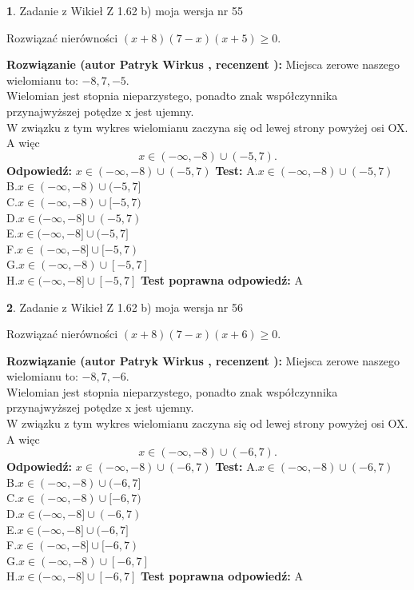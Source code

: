 \documentclass[12pt, a4paper]{article}
\theoremstyle{definition} %
\newtheorem{zad}{}
\newcommand{\zadStart}[1]{\begin{zad}#1\newline}
\newcommand{\zadStop}{\end{zad}}
\newcommand{\rozwStart}[2]{\noindent \textbf{Rozwiązanie (autor #1 , recenzent #2): }\newline}
\newcommand{\rozwStop}{\newline}
\newcommand{\odpStart}{\noindent \textbf{Odpowiedź:}\newline}
\newcommand{\odpStop}{\newline}
\newcommand{\testStart}{\noindent \textbf{Test:}\newline}
\newcommand{\testStop}{\newline}
\newcommand{\kluczStart}{\noindent \textbf{Test poprawna odpowiedź:}\newline}
\newcommand{\kluczStop}{\newline}
\begin{document}
\zadStart{Zadanie z Wikieł Z 1.62 b) moja wersja nr 55}

Rozwiązać nierówności $(x+8)(7-x)(x+5)\ge0$.
\zadStop
\rozwStart{Patryk Wirkus}{}
Miejsca zerowe naszego wielomianu to: $-8, 7, -5$.\\
Wielomian jest stopnia nieparzystego, ponadto znak współczynnika przy\linebreak najwyższej potędze x jest ujemny.\\ W związku z tym wykres wielomianu zaczyna się od lewej strony powyżej osi OX. A więc $$x \in (-\infty,-8) \cup (-5,7).$$
\rozwStop
\odpStart
$x \in (-\infty,-8) \cup (-5,7)$
\odpStop
\testStart
A.$x \in (-\infty,-8) \cup (-5,7)$\\
B.$x \in (-\infty,-8) \cup (-5,7]$\\
C.$x \in (-\infty,-8) \cup [-5,7)$\\
D.$x \in (-\infty,-8] \cup (-5,7)$\\
E.$x \in (-\infty,-8] \cup (-5,7]$\\
F.$x \in (-\infty,-8] \cup [-5,7)$\\
G.$x \in (-\infty,-8) \cup [-5,7]$\\
H.$x \in (-\infty,-8] \cup [-5,7]$
\testStop
\kluczStart
A
\kluczStop



\zadStart{Zadanie z Wikieł Z 1.62 b) moja wersja nr 56}

Rozwiązać nierówności $(x+8)(7-x)(x+6)\ge0$.
\zadStop
\rozwStart{Patryk Wirkus}{}
Miejsca zerowe naszego wielomianu to: $-8, 7, -6$.\\
Wielomian jest stopnia nieparzystego, ponadto znak współczynnika przy\linebreak najwyższej potędze x jest ujemny.\\ W związku z tym wykres wielomianu zaczyna się od lewej strony powyżej osi OX. A więc $$x \in (-\infty,-8) \cup (-6,7).$$
\rozwStop
\odpStart
$x \in (-\infty,-8) \cup (-6,7)$
\odpStop
\testStart
A.$x \in (-\infty,-8) \cup (-6,7)$\\
B.$x \in (-\infty,-8) \cup (-6,7]$\\
C.$x \in (-\infty,-8) \cup [-6,7)$\\
D.$x \in (-\infty,-8] \cup (-6,7)$\\
E.$x \in (-\infty,-8] \cup (-6,7]$\\
F.$x \in (-\infty,-8] \cup [-6,7)$\\
G.$x \in (-\infty,-8) \cup [-6,7]$\\
H.$x \in (-\infty,-8] \cup [-6,7]$
\testStop
\kluczStart
A
\kluczStop
\end{document}
